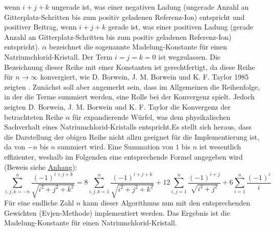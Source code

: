 \documentclass[11pt,a4paper]{article}
\begin{document}
wenn $i+j+k$ ungerade ist, was einer negativen Ladung (ungerade Anzahl an Gitterplatz-Schritten bis zum positiv geladenen Referenz-Ion) entspricht und positiver Beitrag, wenn $i+j+k$ gerade ist, was einer positiven Ladung (gerade Anzahl
an Gitterplatz-Schritten bis zum positiv geladenen Referenz-Ion) entspricht). $\alpha$ bezeichnet die sogenannte Madelung-Konstante für einen Natriumchlorid-Kristall. Der Term $i=j=k=0$ ist wegzulassen. Die Bezeichnung dieser Reihe mit einer Konstanten ist gerechtfertigt, da diese
Reihe für $n \to \infty$ konvergiert, wie D. Borwein, J. M. Borwein und K. F. Taylor 1985 zeigten \cite{key3}. Zunächst soll aber angemerkt sein, dass im Allgemeinen die Reihenfolge, in der die Terme summiert werden, eine Rolle bei der Konvergenz spielt. Jedoch zeigten
D. Borwein, J. M. Borwein und K. F. Taylor die Konvergenz der betrachteten Reihe $\alpha$ für expandierende Würfel, was dem physikalischen Sachverhalt eines Natriumchlorid-Kristalls entspricht.\newline Es stellt sich heraus, dass die Darstellung der obigen Reihe nicht allzu geeignet
für die Implementierung ist, da von $-n$ bis $n$ summiert wird. Eine Summation von $1$ bis $n$ ist wesentlich effizienter, weshalb im Folgenden eine entsprechende Formel angegeben wird (Beweis siehe \hyperref[sec:anhang]{Anhang}):
\begin{equation*}
    \sum_{i,j,k=-n}^{n}\frac{(-1)^{i+j+k}}{\sqrt{i^2 + j^2 + k^2}} = 8\sum_{i,j,k=1}^{n}\frac{(-1)^{i+j+k}}{\sqrt{i^2 + j^2 + k^2}} + 12\sum_{i,j=1}^{n}\frac{(-1)^{i+j}}{\sqrt{i^2 + j^2}} + 6\sum_{i=1}^{n} \frac{(-1)^{i}}{i}
\end{equation*}
Für eine endliche Zahl $n$ kann dieser Algorithmus nun mit den entsprechenden Gewichten (Evjen-Methode) implementiert werden. Das Ergebnis ist die Madelung-Konstante für einen Natriumchlorid-Kristall.\\ \\
\end{document}
